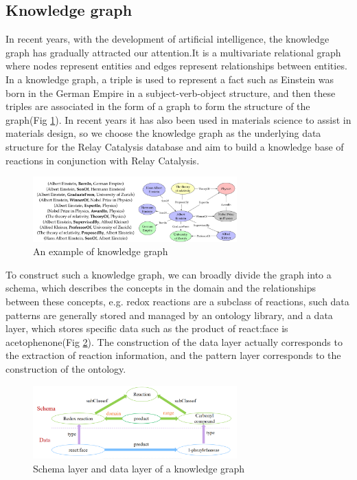 \documentclass[%
 aip,
 jmp,%
 amsmath,amssymb,
 reprint,%
]{revtex4-2}
\begin{document}
\subsection{Knowledge graph}

In recent years, with the development of artificial intelligence, the knowledge graph has gradually 
attracted our attention.It is a multivariate relational graph where nodes represent entities and 
edges represent relationships between entities. In a knowledge graph, a triple is used to represent a 
fact such as Einstein was born in the German Empire in a subject-verb-object structure, and then 
these triples are associated in the form of a graph to form the structure of the graph(Fig \ref{ Fig.2 }). 
In recent years it has also been used in materials science to assist in materials design, 
so we choose the knowledge graph as the underlying data structure for the Relay Catalysis database 
and aim to build a knowledge base of reactions in conjunction with Relay Catalysis.

\begin{figure}[htbp]
 \centering
 \includegraphics[width=0.7\textwidth]{figure/2.png}
 \caption{ An example of knowledge graph }
 \label{ Fig.2 }
\end{figure}

To construct such a knowledge graph, we can broadly divide the graph into a schema, which 
describes the concepts in the domain and the relationships between these concepts, e.g. 
redox reactions are a subclass of reactions, such data patterns are generally stored and 
managed by an ontology library, and a data layer, which stores specific data such as the 
product of react:face is acetophenone(Fig \ref{ Fig.3 }). The construction of the data layer actually 
corresponds to the extraction of reaction information, and the pattern layer corresponds 
to the construction of the ontology. 

\begin{figure}[htbp]
 \centering
 \includegraphics[width=0.7\textwidth]{figure/3.png}
 \caption{ Schema layer and data layer of a knowledge graph }
 \label{ Fig.3 }
\end{figure}
\end{document}
